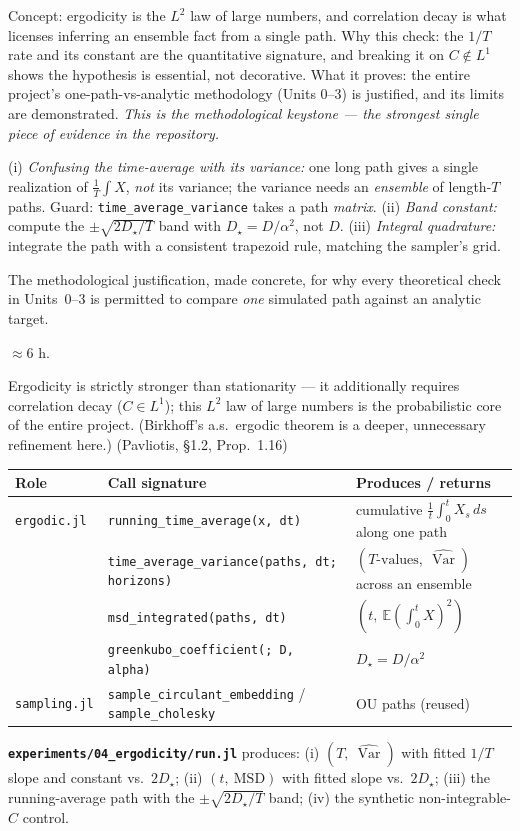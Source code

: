 \documentclass[11pt]{article}
\makeatletter
\newcommand{\pav}[1]{{\small\color{hubblue}(Pavliotis, #1)}}
\newcommand{\Dstar}{D_{\star}}
\newenvironment{unitmeta}{%
  \begin{description}[style=sameline,leftmargin=1.4cm,font=\bfseries\color{hubblue}]
}{%
  \end{description}
}
\newenvironment{contracttable}{%
  \par\smallskip\noindent{\bfseries\color{hubblue}Implementation contract.}\par\nopagebreak\smallskip
  \small
  \setlength{\extrarowheight}{2pt}%
  \noindent\begin{tabular}{@{}p{3.5cm}p{6.8cm}p{4.2cm}@{}}
  \toprule
  \textbf{Role} & \textbf{Call signature} & \textbf{Produces / returns} \\
  \midrule
}{%
  \bottomrule
  \end{tabular}\par\smallskip
}
\makeatother
\begin{document}
\begin{unitmeta}
\item[README] Concept: ergodicity is the $L^2$ law of large numbers, and correlation decay is what licenses inferring an ensemble fact from a single path. Why this check: the $1/T$ rate and its constant are the quantitative signature, and breaking it on $C\notin L^1$ shows the hypothesis is essential, not decorative. What it proves: the entire project's one-path-vs-analytic methodology (Units 0--3) is justified, and its limits are demonstrated. \emph{This is the methodological keystone --- the strongest single piece of evidence in the repository.}
\item[Missteps] (i) \emph{Confusing the time-average with its variance:} one long path gives a single realization of $\frac1T\int X$, \emph{not} its variance; the variance needs an \emph{ensemble} of length-$T$ paths. Guard: \texttt{time\_average\_variance} takes a path \emph{matrix}. (ii) \emph{Band constant:} compute the $\pm\sqrt{2\Dstar/T}$ band with $\Dstar=D/\alpha^2$, not $D$. (iii) \emph{Integral quadrature:} integrate the path with a consistent trapezoid rule, matching the sampler's grid.
\item[Purpose] The methodological justification, made concrete, for why every theoretical check in Units~0--3 is permitted to compare \emph{one} simulated path against an analytic target.
\item[Effort] $\approx 6$ h.
\item[Prerequisite] Ergodicity is strictly stronger than stationarity --- it additionally requires correlation decay ($C\in L^1$); this $L^2$ law of large numbers is the probabilistic core of the entire project. (Birkhoff's a.s.\ ergodic theorem is a deeper, unnecessary refinement here.) \pav{\S1.2, Prop.~1.16}
\end{unitmeta}

\begin{contracttable}
\texttt{ergodic.jl} & \texttt{running\_time\_average(x, dt)} & cumulative $\frac1t\int_0^t X_s\,ds$ along one path \\
 & \texttt{time\_average\_variance(paths, dt; horizons)} & $(T\text{-values},\ \widehat{\operatorname{Var}})$ across an ensemble \\
 & \texttt{msd\_integrated(paths, dt)} & $(t,\ \mathbb{E}(\int_0^t X)^2)$ \\
 & \texttt{greenkubo\_coefficient(; D, alpha)} & $\Dstar = D/\alpha^2$ \\
\texttt{sampling.jl} & \texttt{sample\_circulant\_embedding} / \texttt{sample\_cholesky} & OU paths (reused) \\
\end{contracttable}
\noindent\textbf{\texttt{experiments/04\_ergodicity/run.jl}} produces: (i) $(T,\ \widehat{\operatorname{Var}})$ with fitted $1/T$ slope and constant vs.\ $2\Dstar$; (ii) $(t,\ \text{MSD})$ with fitted slope vs.\ $2\Dstar$; (iii) the running-average path with the $\pm\sqrt{2\Dstar/T}$ band; (iv) the synthetic non-integrable-$C$ control.
\end{document}
